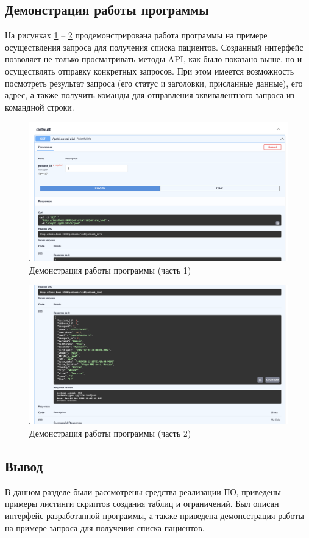 \subsection{Демонстрация работы программы}

На рисунках \ref{fig:example-1} -- \ref{fig:example-2} продемонстрирована работа программы на примере осуществления запроса для получения списка пациентов. Созданный интерфейс позволяет не только просматривать методы API, как было показано выше, но и осуществлять отправку конкретных запросов.
При этом имеется возможность посмотреть результат запроса (его статус и заголовки, присланные данные), его адрес, а также получить команды для отправления эквивалентного запроса из командной строки.

\clearpage

\begin{figure}[h]
	\centering
	\captionsetup{justification=centering}
	\includegraphics[width=152mm]{img/example-1.png}
	\caption{Демонстрация  работы  программы  (часть 1)}
	\label{fig:example-1}
\end{figure}

\begin{figure}[h]
	\centering
	\captionsetup{justification=centering}
 	\includegraphics[width=152mm]{img/example-2.png}
	\caption{Демонстрация  работы  программы  (часть 2)}
	\label{fig:example-2}
\end{figure}


\subsection*{Вывод}
В данном разделе были рассмотрены средства реализации ПО, приведены примеры
листинги скриптов создания таблиц и ограничений. Был описан интерфейс разработанной программы, а также приведена демонсстрация работы на примере запроса для получения списка пациентов.
\pagebreak